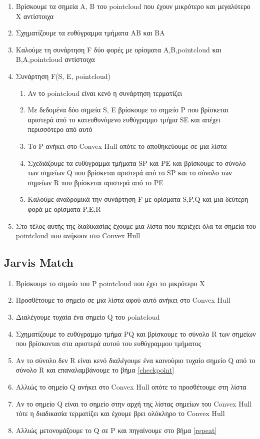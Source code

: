 \documentclass{article}
\begin{document}
\begin{enumerate}
	\item Βρίσκουμε τα σημεία Α, Β του pointcloud που έχουν μικρότερο και μεγαλύτερο X αντίστοιχα
	\item Σχηματίζουμε τα ευθύγραμμα τμήματα ΑΒ και ΒΑ
	\item Καλούμε τη συνάρτηση F δύο φορές με ορίσματα Α,Β,pointcloud και Β,Α,pointcloud αντίστοιχα
	\item Συνάρτηση F(S, E, pointcloud)

	\begin{enumerate}
		\item Αν το pointcloud είναι κενό η συνάρτηση τερματίζει
		\item Με δεδομένα δύο σημεία S, E βρίσκουμε το σημείο P που βρίσκεται αριστερά από το κατευθυνόμενο ευθύγραμμο τμήμα SE και απέχει περισσότερο από αυτό
		\item Το P ανήκει στο Convex Hull οπότε το αποθηκεύουμε σε μια λίστα
		\item Σχεδιάζουμε τα ευθύγραμμα τμήματα SP και PE και βρίσκουμε το σύνολο των σημείων Q που βρίσκεται αριστερά από το SP και το σύνολο των σημείων R που βρίσκεται αριστερά από το PE
		\item Καλούμε αναδρομικά την συνάρτηση F με ορίσματα S,P,Q και μια δεύτερη φορά με ορίσματα P,E,R
	\end{enumerate}

	\item Στο τέλος αυτής της διαδικασίας έχουμε μια λίστα που περιέχει όλα τα σημεία του pointcloud που ανήκουν στο Convex Hull

\end{enumerate}

\subsection{Jarvis Match}

\begin{enumerate}
	\item Βρίσκουμε το σημείο του P pointcloud που έχει το μικρότερο X
	\item Προσθέτουμε το σημείο σε μια λίστα αφού αυτό ανήκει στο Convex Hull
	\item \label{repeat} Διαλέγουμε τυχαία ένα σημείο Q του pointcloud
	\item \label{checkpoint} Σχηματίζουμε το ευθύγραμμο τμήμα PQ και βρίσκουμε το σύνολο R των σημείων που βρίσκονται στα αριστερά αυτού του ευθύγραμμου τμήματος
	\item Αν το σύνολο δεν R είναι κενό διαλέγουμε ένα καινούριο τυχαίο σημείο Q από το σύνολο R και επαναλαμβάνουμε το βήμα \ref{checkpoint}
	\item Αλλιώς το σημείο Q ανήκει στο Convex Hull οπότε το προσθέτουμε στη λίστα
	\item Αν το σημείο Q είναι το σημείο στην αρχή της λίστας σημείων του Convex Hull τότε η διαδικασία τερματίζει και έχουμε βρει ολόκληρο το Convex Hull
	\item Αλλιώς μετονομάζουμε το Q σε P και πηγαίνουμε στο βήμα \ref{repeat}
\end{enumerate}
\end{document}
